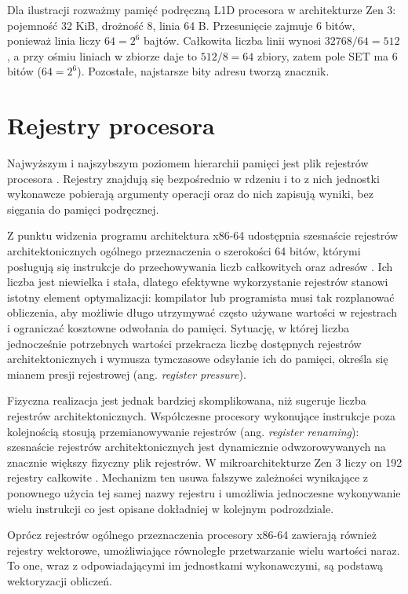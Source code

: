 \documentclass[a4paper,12pt]{book} %
\begin{document}
Dla ilustracji rozważmy pamięć podręczną L1D procesora w architekturze Zen 3: pojemność 32 KiB, drożność 8, linia 64 B. Przesunięcie zajmuje 6 bitów, ponieważ linia liczy $64 = 2^{6}$ bajtów. Całkowita liczba linii wynosi $32768 / 64 = 512$, a przy ośmiu liniach w zbiorze daje to $512 / 8 = 64$ zbiory, zatem pole SET ma 6 bitów ($64 = 2^{6}$). Pozostałe, najstarsze bity adresu tworzą znacznik.

\section{Rejestry procesora}
\label{sec:rejestry}

Najwyższym i najszybszym poziomem hierarchii pamięci jest plik rejestrów procesora \cite{hennessy2017architecture}. Rejestry znajdują się bezpośrednio w rdzeniu i to z nich jednostki wykonawcze pobierają argumenty operacji oraz do nich zapisują wyniki, bez sięgania do pamięci podręcznej.

Z punktu widzenia programu architektura x86-64 udostępnia szesnaście rejestrów architektonicznych ogólnego przeznaczenia o szerokości 64 bitów, którymi posługują się instrukcje do przechowywania liczb całkowitych oraz adresów \cite{amd64_apm_vol1}. Ich liczba jest niewielka i stała, dlatego efektywne wykorzystanie rejestrów stanowi istotny element optymalizacji: kompilator lub programista musi tak rozplanować obliczenia, aby możliwie długo utrzymywać często używane wartości w rejestrach i ograniczać kosztowne odwołania do pamięci. Sytuację, w której liczba jednocześnie potrzebnych wartości przekracza liczbę dostępnych rejestrów architektonicznych i wymusza tymczasowe odsyłanie ich do pamięci, określa się mianem presji rejestrowej (ang. \emph{register pressure}).

Fizyczna realizacja jest jednak bardziej skomplikowana, niż sugeruje liczba rejestrów architektonicznych. Współczesne procesory wykonujące instrukcje poza kolejnością stosują przemianowywanie rejestrów (ang. \emph{register renaming}): szesnaście rejestrów architektonicznych jest dynamicznie odwzorowywanych na znacznie większy fizyczny plik rejestrów. W mikroarchitekturze Zen 3 liczy on 192 rejestry całkowite \cite{fog_microarchitecture}. Mechanizm ten usuwa fałszywe zależności wynikające z ponownego użycia tej samej nazwy rejestru i umożliwia jednoczesne wykonywanie wielu instrukcji co jest opisane dokładniej w kolejnym podrozdziale.

Oprócz rejestrów ogólnego przeznaczenia procesory x86-64 zawierają również rejestry wektorowe, umożliwiające równoległe przetwarzanie wielu wartości naraz. To one, wraz z odpowiadającymi im jednostkami wykonawczymi, są podstawą wektoryzacji obliczeń.
\end{document}
